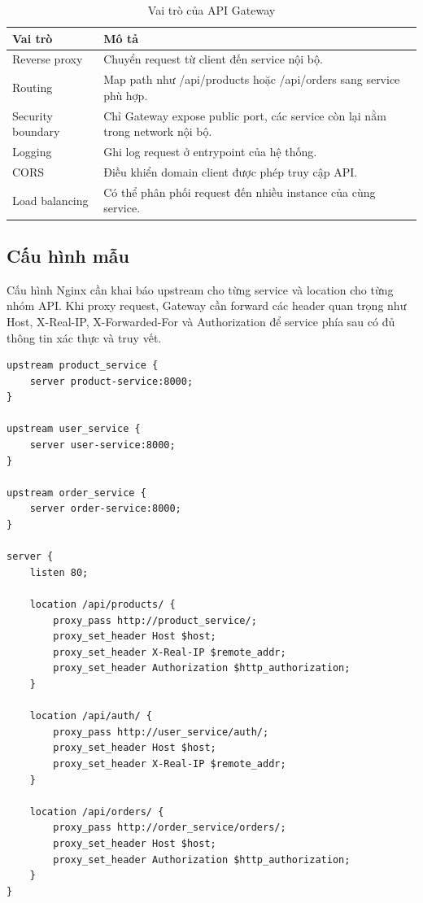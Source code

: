 \documentclass[../main.tex]{subfiles}
\begin{document}
\begin{table}[H]
    \centering
    \caption{Vai trò của API Gateway}
    \label{tab:chapter4-gateway-roles}
    \begin{tabular}{|p{}|p{}|}
        \hline
        \rowcolor{primary!35}
        \textbf{Vai trò} & \textbf{Mô tả} \\
        \hline
        Reverse proxy & Chuyển request từ client đến service nội bộ. \\
        \hline
        Routing & Map path như /api/products hoặc /api/orders sang service phù hợp. \\
        \hline
        Security boundary & Chỉ Gateway expose public port, các service còn lại nằm trong network nội bộ. \\
        \hline
        Logging & Ghi log request ở entrypoint của hệ thống. \\
        \hline
        CORS & Điều khiển domain client được phép truy cập API. \\
        \hline
        Load balancing & Có thể phân phối request đến nhiều instance của cùng service. \\
        \hline
    \end{tabular}
\end{table}

\subsection{Cấu hình mẫu}
\label{subsection:4.3.2}

Cấu hình Nginx cần khai báo upstream cho từng service và location cho từng nhóm API. Khi proxy request, Gateway cần forward các header quan trọng như Host, X-Real-IP, X-Forwarded-For và Authorization để service phía sau có đủ thông tin xác thực và truy vết.

\begin{lstlisting}[caption={Cấu hình Nginx Gateway mẫu}, label={lst:chapter4-nginx-config}]
upstream product_service {
    server product-service:8000;
}

upstream user_service {
    server user-service:8000;
}

upstream order_service {
    server order-service:8000;
}

server {
    listen 80;

    location /api/products/ {
        proxy_pass http://product_service/;
        proxy_set_header Host $host;
        proxy_set_header X-Real-IP $remote_addr;
        proxy_set_header Authorization $http_authorization;
    }

    location /api/auth/ {
        proxy_pass http://user_service/auth/;
        proxy_set_header Host $host;
        proxy_set_header X-Real-IP $remote_addr;
    }

    location /api/orders/ {
        proxy_pass http://order_service/orders/;
        proxy_set_header Host $host;
        proxy_set_header Authorization $http_authorization;
    }
}
\end{lstlisting}
\end{document}
